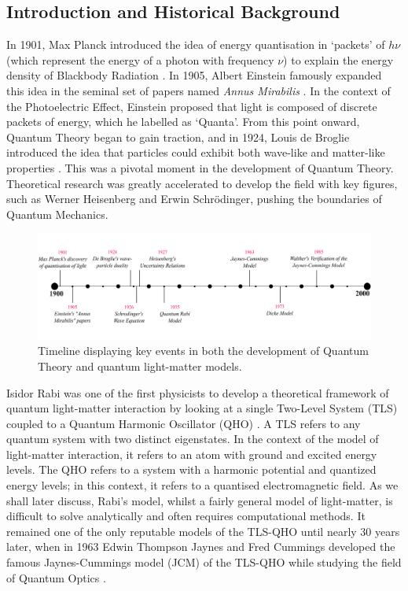 \documentclass[12pt,a4paper]{article}
\begin{document}
\subsection{Introduction and Historical Background} \label{subsec_history}

In 1901, Max Planck introduced the idea of energy quantisation in `packets' of $h\nu$ (which represent the energy of a photon with frequency $\nu$) to explain the energy density of Blackbody Radiation \cite{Context1901-Planck}. In 1905, Albert Einstein famously expanded this idea in the seminal set of papers named \textit{Annus Mirabilis} \cite{Context1905-Einstein}. In the context of the Photoelectric Effect, Einstein proposed that light is composed of discrete packets of energy, which he labelled as `Quanta'. From this point onward, Quantum Theory began to gain traction, and in 1924, Louis de Broglie introduced the idea that particles could exhibit both wave-like and matter-like properties \cite{Context1924-DeBroglie}. This was a pivotal moment in the development of Quantum Theory. Theoretical research was greatly accelerated to develop the field with key figures, such as Werner Heisenberg and Erwin Schrödinger, pushing the boundaries of Quantum Mechanics. \\

\begin{figure}[h]
    \centering
    \includegraphics[scale=0.66]{timeline_JCM}
    \caption{Timeline displaying key events in both the development of Quantum Theory and quantum light-matter models.}
    \label{fig:timeline}
\end{figure}


Isidor Rabi was one of the first physicists to develop a theoretical framework of quantum light-matter interaction by looking at a single Two-Level System (TLS) coupled to a Quantum Harmonic Oscillator (QHO) \cite{Context1936-Rabi}. A TLS refers to any quantum system with two distinct eigenstates. In the context of the model of light-matter interaction, it refers to an atom with ground and excited energy levels. The QHO refers to a system with a harmonic potential and quantized energy levels; in this context, it refers to a quantised electromagnetic field. As we shall later discuss, Rabi's model, whilst a fairly general model of light-matter, is difficult to solve analytically and often requires computational methods. It remained one of the only reputable models of the TLS-QHO until nearly 30 years later, when in 1963 Edwin Thompson Jaynes and Fred Cummings developed the famous Jaynes-Cummings model (JCM) of the TLS-QHO while studying the field of Quantum Optics \cite{Context1963-JC_Original}. \\
\end{document}
